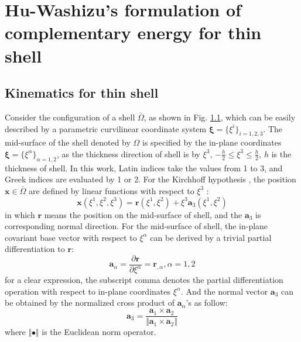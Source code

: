 \section{Hu-Washizu's formulation of complementary energy for thin shell}
\subsection{Kinematics for thin shell}
Consider the configuration of a shell $\bar \Omega$, as shown in Fig. \ref{}, which can be easily described by a parametric curvilinear coordinate system $\boldsymbol \xi = \{\xi^i\}_{i=1,2,3}$. The mid-surface of the shell denoted by $\Omega$ is specified by the in-plane coordinates $\boldsymbol \xi = \{\xi^\alpha\}_{\alpha=1,2}$, as the thickness direction of shell is by $\xi^3$, $-\frac{h}{2} \le \xi^3 \le \frac{h}{2}$, $h$ is the thickness of shell. In this work, Latin indices take the values from 1 to 3, and Greek indices are evaluated by 1 or 2. For the Kirchhoff hypothesis \cite{krysl1996}, the position $\boldsymbol x\in \bar \Omega$ are defined by linear functions with respect to $\xi^3$ :
\begin{equation}\label{x}
\boldsymbol x(\xi^1, \xi^2, \xi^3) = \boldsymbol r(\xi^1,\xi^2) + \xi^3 \boldsymbol a_3(\xi^1,\xi^2)
\end{equation}
in which $\boldsymbol r$ means the position on the mid-surface of shell, and the $\boldsymbol a_3$ is corresponding normal direction. For the mid-surface of shell, the in-plane covariant base vector with respect to $\xi^\alpha$ can be derived by a trivial partial differentiation to $\boldsymbol r$:
\begin{equation}
\boldsymbol a_\alpha = \frac{\partial \boldsymbol r}{\partial \xi^\alpha} = \boldsymbol r_{,\alpha}, \alpha  = 1,2
\end{equation}
for a clear expression, the subscript comma denotes the partial differentiation operation with respect to in-plane coordinates $\xi^\alpha$. And the normal vector $\boldsymbol a_3$ can be obtained by the normalized cross product of $\boldsymbol a_{\alpha}$'s as follow:
\begin{equation}
\boldsymbol a_3 = \frac{\boldsymbol a_1 \times \boldsymbol a_2}{\Vert \boldsymbol a_1 \times \boldsymbol a_2 \Vert}
\end{equation}
where $\Vert \bullet \Vert$ is the Euclidean norm operator.

